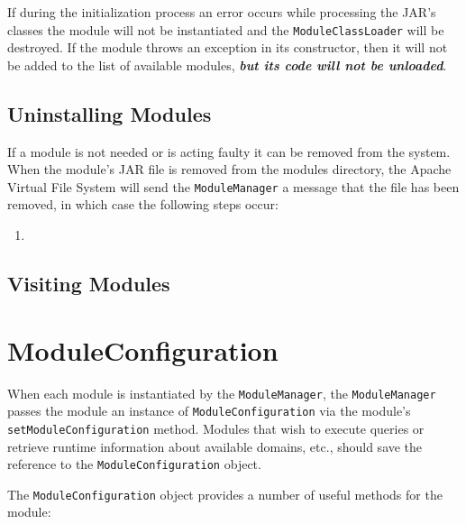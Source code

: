 \documentclass[letterpaper]{report}
\begin{document}
If during the initialization process an error occurs while processing the JAR's classes the module will not be instantiated and the \texttt{ModuleClassLoader} will be destroyed. If the module throws an exception in its constructor, then it will not be added to the list of available modules, \textbf{\textit{but its code will not be unloaded}}.

\subsection{Uninstalling Modules}
If a module is not needed or is acting faulty it can be removed from the system. When the module's JAR file is removed from the modules directory, the Apache Virtual File System will send the \texttt{ModuleManager} a message that the file has been removed, in which case the following steps occur:

\begin{enumerate}
\item 
\end{enumerate}

\subsection{Visiting Modules}

\section{ModuleConfiguration}
When each module is instantiated by the \texttt{ModuleManager}, the \texttt{ModuleManager} passes the module an instance of \texttt{ModuleConfiguration} via the module's \texttt{setModuleConfiguration} method. Modules that wish to execute queries or retrieve runtime information about available domains, etc., should save the reference to the \texttt{ModuleConfiguration} object.

The \texttt{ModuleConfiguration} object provides a number of useful methods for the module:
\end{document}

